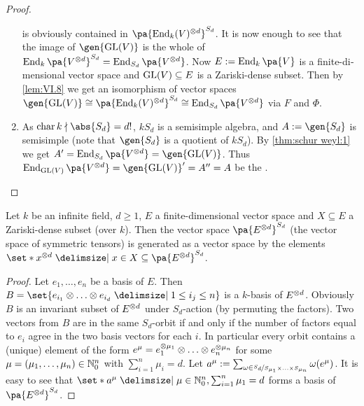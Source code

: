 \documentclass[12pt,a4paper]{scrartcl}
\theoremstyle{cplain}
\theoremstyle{cplain}
\theoremstyle{cplain}
\theoremstyle{definition}
\begin{document}
\begin{otherlanguage}{english}
\begin{proof}
\begin{enumerate}[label=\ref{thm:schur weyl:\arabic*}]
    is obviously contained in $\pa{\End_k(V)^{\tp d}}^{S_d}$. It is now enough to see that the image of $\gen{\GL(V)}$ is the whole of $\End_k\pa{V^{\tp d}}^{S_d} = \End_{S_d}\pa{V^{\tp d}}$. Now $E := \End_k\pa{V}$ is a finite-dimensional vector space and $\operatorname{GL}(V) \subseteq E$ is a Zariski-dense subset. Then by \cref{lem:VI.8} we get an isomorphism of vector spaces $\gen{\GL(V)} \cong \pa{\End_k(V)^{\tp d}}^{S_d} \cong \End_{S_d}\pa{V^{\tp d}}$ via $F$ and $\Phi$.
    \item As $\chr k \nmid \abs{S_d} = d!$, $kS_d$ is a semisimple algebra, and $A := \gen{S_d}$ is semisimple (note that $\gen{S_d}$ is a quotient of $kS_d$). By \ref{thm:schur weyl:1} we get $A' = \End_{S_d}\pa{V^{\otimes d}} = \gen{\GL(V)}$. Thus $\End_{\GL(V)}\pa{V^{\otimes d}} = \gen{\GL(V)}' = A'' = A$ be the .
    \qedhere
  \end{enumerate}
\end{proof}

\begin{lem} \label{lem:VI.8}
  Let $k$ be an infinite field, $d \ge 1$, $E$ a finite-dimensional vector space and $X \subseteq E$ a Zariski-dense subset (over $k$). Then the vector space $\pa{E^{\tp d}}^{S_d}$ (the vector space of symmetric tensors) is generated as a vector space by the elements $ \set*{x^{\tp d}\given x \in X} \subseteq \pa{E^{\tp d}}^{S_d}$.
\end{lem}
\begin{proof}  
  Let $e_1, \ldots,e_n$ be a basis of $E$. Then $B = \set{e_{i_1} \tp \ldots \tp e_{i_d} \given 1\le i_j \le n }$ is a $k$-basis of $E^{\otimes d}$. Obviously $B$ is an invariant subset of $E^{\otimes d}$ under $S_d$-action (by permuting the factors). Two vectors from $B$ are in the same $S_d$-orbit if and only if the number of factors equal to $e_i$ agree in the two basis vectors for each $i$. In particular every orbit contains a (unique) element of the form $e^\mu = e_1^{\otimes \mu_1} \otimes \ldots \otimes e_n^{\otimes\mu_n}$ for some $\mu=(\mu_1,\ldots,\mu_n)\in \mathbb N_0^n$ with $\sum_{i=1}^n\mu_i = d$. Let $a ^\mu := \sum_{{\omega\in \nicefrac{S_d}{S_{\mu_1}\times \ldots \times S_{\mu _n}}}} \omega (e^\mu)$. It is easy to see that $\set*{a^\mu \given \mu \in \IN_0^n, \sum_{i=1}^n\mu_1 = d}$ forms a basis of $\pa{E^{\tp d}}^{S_d}$.
  

\end{proof}
\end{otherlanguage}
\end{document}
